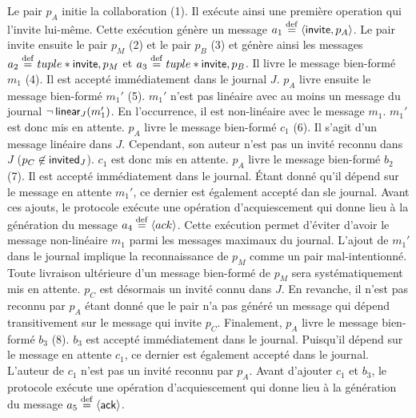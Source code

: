 Le pair $p_A$ initie la collaboration (1).
Il exécute ainsi une première operation qui l'invite lui-même.
Cette exécution génère un message $a_1 \defeq \tuple*{\trm{invite}, p_A}$.
Le pair invite ensuite le pair $p_M$ (2) et le pair $p_B$ (3) et génère ainsi les messages $a_2 \defeq tuple*{\trm{invite}, p_M}$ et $a_3 \defeq tuple*{\trm{invite}, p_B}$.
Il livre le message bien-formé $m_1$ (4).
Il est accepté immédiatement dans le journal $J$.
$p_A$ livre ensuite le message bien-formé $m_1'$ (5).
$m_1'$ n'est pas linéaire avec au moins un message du journal $\neg \trm{linear}_J(m_1')$.
En l'occurrence, il est non-linéaire avec le message $m_1$.
$m_1'$ est donc mis en attente.
$p_A$ livre le message bien-formé $c_1$ (6).
Il s'agit d'un message linéaire dans $J$.
Cependant, son auteur n'est pas un invité reconnu dans $J$ ($p_C \not\in \trm{invited}_J$).
$c_1$ est donc mis en attente.
$p_A$ livre le message bien-formé $b_2$ (7).
Il est accepté immédiatement dans le journal.
Étant donné qu'il dépend sur le message en attente $m_1'$, ce dernier est également accepté dan sle journal.
Avant ces ajouts, le protocole exécute une opération d'acquiescement qui donne lieu à la génération du message $a_4 \defeq \tuple*{ack}$.
Cette exécution permet d'éviter d'avoir le message non-linéaire $m_1$ parmi les messages maximaux du journal.
L'ajout de $m_1'$ dans le journal implique la reconnaissance de $p_M$ comme un pair mal-intentionné.
Toute livraison ultérieure d'un message bien-formé de $p_M$ sera systématiquement mis en attente.
$p_C$ est désormais un invité connu dans $J$.
En revanche, il n'est pas reconnu par $p_A$ étant donné que le pair n'a pas généré un message qui dépend transitivement sur le message qui invite $p_C$.
Finalement, $p_A$ livre le message bien-formé $b_3$ (8).
$b_3$ est accepté immédiatement dans le journal.
Puisqu'il dépend sur le message en attente $c_1$, ce dernier est également accepté dans le journal.
L'auteur de $c_1$ n'est pas un invité reconnu par $p_A$.
Avant d'ajouter $c_1$ et $b_3$, le protocole exécute une opération d'acquiescement qui donne lieu à la génération du message $a_5 \defeq \tuple*{\trm{ack}}$.


